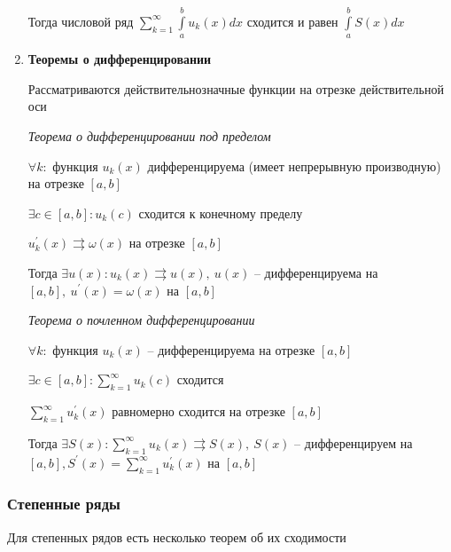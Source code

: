 \documentclass{article}
\begin{document}
\begin{enumerate}
	Тогда числовой ряд $\sum\limits_{k=1}^{\infty}\int\limits_{a}^{b} u_k(x) dx$ сходится и равен $\int\limits_a^b S(x) dx$
	
	\item {\bf Теоремы о дифференцировании}
	
	Рассматриваются действительнозначные функции на отрезке действительной оси
	
	{\it Теорема о дифференцировании под пределом}
	
	$\forall k:$ функция $u_k(x)$ дифференцируема (имеет непрерывную производную) на отрезке $[a, b]$
	
	$\exists c \in [a, b]: u_k(c)$ сходится к конечному пределу
	
	$u_k^{\prime}(x)  \rightrightarrows \omega(x)$ на отрезке $[a, b]$
	
	Тогда $\exists u(x): u_k(x) \rightrightarrows u(x),\ u(x)$ -- дифференцируема на $[a, b],\ u^{\prime}(x) = \omega(x)$ на $[a, b]$
	
	{\it Теорема о почленном дифференцировании}

	$\forall k:$ функция $u_k(x)$ -- дифференцируема на отрезке $[a, b]$
	
	$\exists c \in [a, b]: \sum\limits_{k=1}^{\infty} u_k(c)$ сходится
	
	$\sum\limits_{k=1}^{\infty}u_k^{\prime}(x)$ равномерно сходится на отрезке $[a, b]$
	
	Тогда $\exists S(x): \sum\limits_{k=1}^{\infty}u_k(x) \rightrightarrows S(x),\ S(x)$ -- дифференцируем на $[a, b], S^{\prime}(x) = \sum\limits_{k=1}^{\infty}u_k^{\prime}(x)$ на $[a, b]$
	
\end{enumerate}

\subsubsection{Степенные ряды}


Для степенных рядов есть несколько теорем об их сходимости
\end{document}

